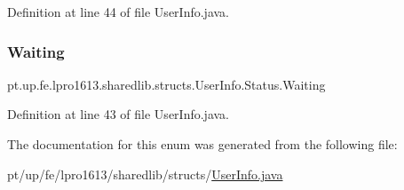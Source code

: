 Definition at line 44 of file User\+Info.\+java.

\hypertarget{enumpt_1_1up_1_1fe_1_1lpro1613_1_1sharedlib_1_1structs_1_1_user_info_1_1_status_a4f155fcf6ad4f83014128a3099d28909}{}\label{enumpt_1_1up_1_1fe_1_1lpro1613_1_1sharedlib_1_1structs_1_1_user_info_1_1_status_a4f155fcf6ad4f83014128a3099d28909} 
\subsubsection{\texorpdfstring{Waiting}{Waiting}}
{\footnotesize\ttfamily pt.\+up.\+fe.\+lpro1613.\+sharedlib.\+structs.\+User\+Info.\+Status.\+Waiting}



Definition at line 43 of file User\+Info.\+java.



The documentation for this enum was generated from the following file\+:\begin{DoxyCompactItemize}
\item 
pt/up/fe/lpro1613/sharedlib/structs/\hyperlink{_user_info_8java}{User\+Info.\+java}\end{DoxyCompactItemize}
